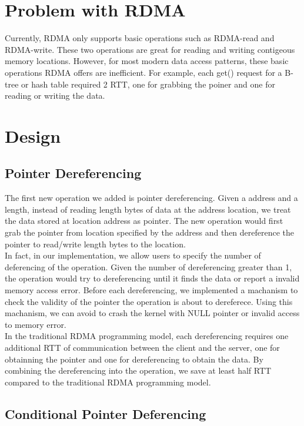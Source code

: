 \documentclass[a4paper, oneside, 10pt]{article}
\begin{document}
\section{Problem with RDMA}
Currently, RDMA only supports basic operations such as RDMA-read and
RDMA-write.  These two operations are great for reading and writing contigeous
memory locations. However, for most modern data access patterns, these basic
operations RDMA offers are inefficient. For example, each get() request for a
B-tree or hash table required 2 RTT, one for grabbing the poiner and one for
reading or writing the data.
\section{Design}
\subsection{Pointer Dereferencing}

The first new operation we added is pointer dereferencing. Given a address and a
length, instead of reading length bytes of data at the address location, we
treat the data stored at location address as pointer. The new operation would
first grab the pointer from location specified by the address and then
dereference the pointer to read/write length bytes to the location.\\

In fact, in our implementation, we allow users to specify the number of
deferencing of the operation. Given the number of dereferencing greater than 1,
the operation would try to dereferencing until it finds the data or report a
invalid memory access error. Before each dereferencing, we implemented a
machanism to check the validity of the pointer the operation is about to
dereferece. Using this machanism, we can avoid to crash the kernel with NULL
pointer or invalid access to memory error.\\

In the traditional RDMA programming model, each dereferencing requires one
additional RTT of communication between the client and the server, one for
obtainning the pointer and one for dereferencing to obtain the data. By
combining the dereferencing into the operation, we save at least half RTT
compared to the traditional RDMA programming model.

\subsection{Conditional Pointer Deferencing}
\end{document}
